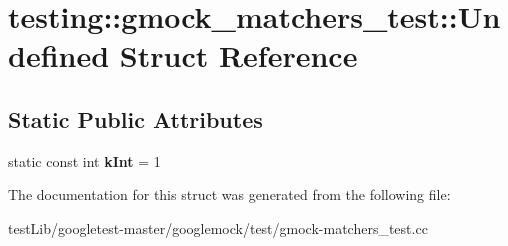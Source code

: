 \hypertarget{structtesting_1_1gmock__matchers__test_1_1Undefined}{}\section{testing\+:\+:gmock\+\_\+matchers\+\_\+test\+:\+:Undefined Struct Reference}
\label{structtesting_1_1gmock__matchers__test_1_1Undefined}
\subsection*{Static Public Attributes}
\begin{DoxyCompactItemize}
\item 
\mbox{\label{structtesting_1_1gmock__matchers__test_1_1Undefined_a59bddeb8647abbf50ee51b8ca8f0989b}} 
static const int {\bfseries k\+Int} = 1
\end{DoxyCompactItemize}


The documentation for this struct was generated from the following file\+:\begin{DoxyCompactItemize}
\item 
test\+Lib/googletest-\/master/googlemock/test/gmock-\/matchers\+\_\+test.\+cc\end{DoxyCompactItemize}
